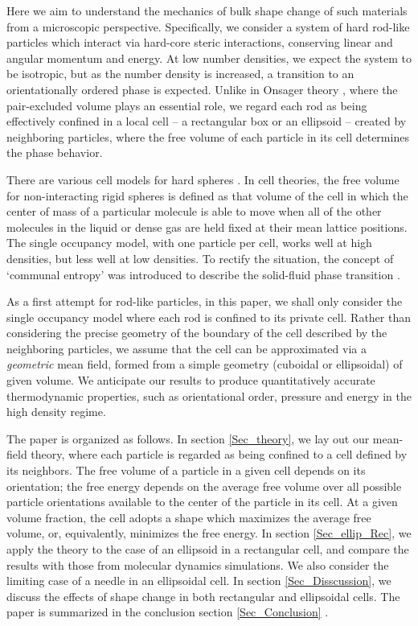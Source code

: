 \documentclass{article}
\begin{document}
Here we aim to understand the mechanics of bulk shape change of such
materials from a microscopic perspective. Specifically, we consider a system
of hard rod-like particles which interact via hard-core steric interactions,
conserving linear and angular momentum and energy. At low number densities,
we expect the system to be isotropic, but as the number density is
increased, a transition to an orientationally ordered phase is expected.
Unlike in Onsager theory \cite{Onsager1949}, where the pair-excluded volume
plays an essential role, we regard each rod as being effectively confined in
a local cell -- a rectangular box or an ellipsoid -- created by neighboring
particles, where the free volume of each particle in its cell determines the
phase behavior.

There are various cell models for hard spheres \cite{Devonshire1937,
Eyring1941}. In cell theories, the free volume for non-interacting rigid
spheres is defined as that volume of the cell in which the center of mass of
a particular molecule is able to move when all of the other molecules in the
liquid or dense gas are held fixed at their mean lattice positions. The
single occupancy model, with one particle per cell, works well at high
densities, but less well at low densities. To rectify the situation, the
concept of `communal entropy' was introduced to describe the solid-fluid
phase transition \cite{Kirkwood1950}.

As a first attempt for rod-like particles, in this paper, we shall only
consider the single occupancy model where each rod is confined to its
private cell. Rather than considering the precise geometry of the boundary
of the cell described by the neighboring particles, we assume that the cell
can be approximated via a \textit{geometric} mean field, formed from a
simple geometry (cuboidal or ellipsoidal) of given volume. We anticipate our
results to produce quantitatively accurate thermodynamic properties, such as
orientational order, pressure and energy in the high density regime.

The paper is organized as follows. In section \ref{Sec_theory}, we lay out
our mean-field theory, where each particle is regarded as being confined to
a cell defined by its neighbors. The free volume of a particle in a given
cell depends on its orientation; the free energy depends on the average free
volume over all possible particle orientations available to the center of
the particle in its cell. At a given volume fraction, the cell adopts a
shape which maximizes the average free volume, or, equivalently, minimizes
the free energy. In section \ref{Sec_ellip_Rec}, we apply the theory to the
case of an ellipsoid in a rectangular cell, and compare the results with
those from molecular dynamics simulations. We also consider the limiting
case of a needle in an ellipsoidal cell. In section \ref{Sec_Disscussion},
we discuss the effects of shape change in both rectangular and ellipsoidal
cells. The paper is summarized in the conclusion section \ref{Sec_Conclusion}%
.
\end{document}
